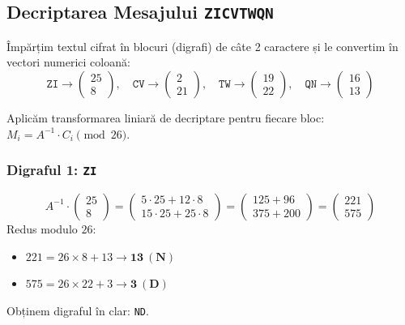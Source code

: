 \documentclass[12pt]{article}
\begin{document}
\subsection*{Decriptarea Mesajului \texttt{ZICVTWQN}}
Împărțim textul cifrat în blocuri (digrafi) de câte 2 caractere și le convertim în vectori numerici coloană:
\[
\texttt{ZI} \rightarrow \begin{pmatrix} 25 \\ 8 \end{pmatrix}, \quad 
\texttt{CV} \rightarrow \begin{pmatrix} 2 \\ 21 \end{pmatrix}, \quad 
\texttt{TW} \rightarrow \begin{pmatrix} 19 \\ 22 \end{pmatrix}, \quad 
\texttt{QN} \rightarrow \begin{pmatrix} 16 \\ 13 \end{pmatrix}
\]

Aplicăm transformarea liniară de decriptare pentru fiecare bloc: $M_i = A^{-1} \cdot C_i \pmod{{26}}$.

\subsubsection*{Digraful 1: \texttt{ZI}}
\[
A^{-1} \cdot \begin{pmatrix} 25 \\ 8 \end{pmatrix} = \begin{pmatrix} 5 \cdot 25 + 12 \cdot 8 \\ 15 \cdot 25 + 25 \cdot 8 \end{pmatrix} = \begin{pmatrix} 125 + 96 \\ 375 + 200 \end{pmatrix} = \begin{pmatrix} 221 \\ 575 \end{pmatrix}
\]
Redus modulo $26$:
\begin{itemize}
    \item $221 = 26 \times 8 + 13 \rightarrow \mathbf{13 \ (N)}$
    \item $575 = 26 \times 22 + 3 \rightarrow \mathbf{3 \ (D)}$
\end{itemize}
Obținem digraful în clar: \texttt{ND}.
\end{document}
